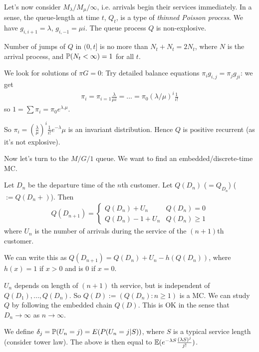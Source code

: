 \documentclass[a4paper]{article}
\begin{document}
Let's now consider $M_\lambda/M_\mu/\infty$, i.e. arrivals begin their services immediately. In a sense, the queue-length at time $t$, $Q_t$, is a type of \emph{thinned Poisson process}. We have $g_{i,i+1} = \lambda$, $g_{i,-1} = \mu i $. The queue process $Q$ is non-explosive.

Number of jumps of $Q$ in $(0,t]$ is no more than $N_t + N_t = 2N_t$, where $N$ is the arrival process, and $\P(N_t < \infty) = 1$ for all $t$.

We look for solutions of $\pi G = 0$: Try detailed balance equations $\pi_i g_{i,j} = \pi_j g_{ji}$: we get
\begin{equation*}
\begin{aligned}
\pi_i = \pi_{i=1} \frac{\lambda}{\mu i} = ... = \pi_0 (\lambda/\mu)^i \frac{1}{i!}
\end{aligned}
\end{equation*}
so $1 = \sum \pi_i = \pi_0 e^{\lambda.\mu}$.

So $\pi_i = (\frac{\lambda}{\mu})^i \frac{1}{i!} e^{-\lambda}{\mu}$ is an invariant distribution. Hence $Q$ is positive recurrent (as it's not explosive).

Now let's turn to the $M/G/1$ queue. We want to find an embedded/discrete-time MC.

Let $D_n$ be the departure time of the $n$th customer. Let $Q(D_n)$ ($=Q_{D_n}$) ($:= Q(D_n+)$). Then 
\begin{equation*}
\begin{aligned}
Q(D_{n+1}) = \left\{\begin{array}{ll}
Q(D_n) + U_n & Q(D_n) =0 \\
Q(D_n) - 1 + U_n & Q(D_n) \geq 1
\end{array}
\right.
\end{aligned}
\end{equation*}
where $U_n$ is the number of arrivals during the service of the $(n+1)$th customer.

We can write this as $Q(D_{n+1}) = Q(D_n) + U_n - h(Q(D_n))$, where $h(x) = 1$ if $x>0$ and is $0$ if $x=0$.

$U_n$ depends on length of $(n+1)$ th service, but is independent of $Q(D_1),...,Q(D_n)$. So $Q(D):=(Q(D_n):n\geq 1)$ is a MC. We can study $Q$ by following the embedded chain $Q(D)$. This is OK in the sense that $D_n \to \infty$ as $n \to \infty$.

We define $\delta_j = \P(U_n = j) = E(P(U_n = j|S))$, where $S$ is a typical service length (consider tower law). The above is then equal to $\E(e^{-\lambda S} \frac{(\lambda S)^j}{j!})$.
\end{document}
